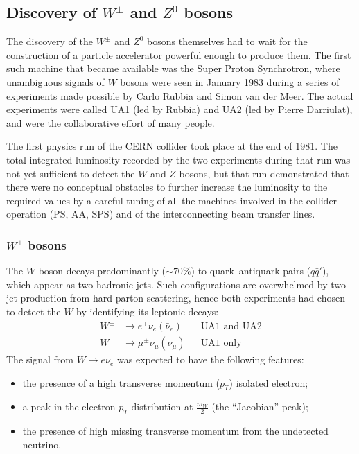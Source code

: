 \documentclass[../../main/main.tex]{subfiles}
\begin{document}
\subsection{Discovery of \( W^{\pm} \) and \( Z^0 \) bosons}
The discovery of the \( W^{\pm} \) and \( Z^0 \) bosons themselves had to wait for the construction of a particle accelerator powerful enough to produce them. The first such machine that became available was the Super Proton Synchrotron, where unambiguous signals of \( W \) bosons were seen in January 1983 during a series of experiments made possible by Carlo Rubbia and Simon van der Meer. The actual experiments were called UA1 (led by Rubbia) and UA2 (led by Pierre Darriulat), and were the collaborative effort of many people.

The first physics run of the CERN collider took place at the end of 1981. The total integrated luminosity recorded by the two experiments during that run was not yet sufficient to detect the \( W \) and \( Z \) bosons, but that run demonstrated that there were no conceptual obstacles to further increase the luminosity to the required values by a careful tuning of all the machines involved in the collider operation (PS, AA, SPS) and of the interconnecting beam transfer lines.

\subsubsection*{\( W^{\pm} \) bosons}
The \( W \) boson decays predominantly (\( \sim 70\% \)) to quark–antiquark pairs (\( q\bar{q}' \)), which appear as two hadronic jets. Such configurations are overwhelmed by two-jet
production from hard parton scattering, hence both experiments had chosen to detect the \( W \) by identifying its leptonic decays:
\begin{align}
	W^{\pm} &\longrightarrow e^{\pm} \nu_e (\bar{\nu}_e)	&&	\text{UA1 and UA2}	\\
	W^{\pm} &\longrightarrow \mu^{\pm} \nu_{\mu} (\bar{\nu}_{\mu})	&&	\text{UA1 only}
\end{align}
The signal from \( W \rightarrow e\nu_e \) was expected to have the following features:
\begin{itemize}
	\item the presence of a high transverse momentum (\( p_T \)) isolated electron;
	\item a peak in the electron \( p_T \) distribution at \( \frac{m_W}{2} \) (the ``Jacobian'' peak);
	\item the presence of high missing transverse momentum from the undetected neutrino.
\end{itemize}
\end{document}
